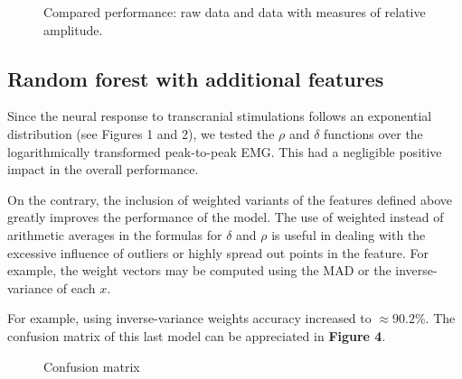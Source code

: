 \documentclass{article}
\begin{document}
\begin{multicols}{2}
\begin{figure}[H]
  \centering
  \hfill
  \caption{Compared performance: raw data and data with measures of relative
  amplitude.}
  \label{fig:two_images}
\end{figure}


\subsection{Random forest with additional features}

Since the neural response to transcranial stimulations follows an exponential
distribution (see Figures 1 and 2), we tested the $\rho$ and $\delta$ functions
over the logarithmically transformed peak-to-peak EMG. This had a negligible
positive impact in the overall performance.

On the contrary, the inclusion of weighted variants of the features defined
above greatly improves the performance of the model. The use of weighted instead
of arithmetic averages in the formulas for $\delta$ and $\rho$ is useful in
dealing with the excessive influence of outliers or highly spread out points in
the feature. For example, the weight vectors may be computed using the MAD or
the inverse-variance of each $x$. 

For example, using inverse-variance weights accuracy increased to $\approx
90.2\%$. The confusion matrix of this last model can be appreciated in
\textbf{Figure 4}.

\begin{figure}[H]
    \centering
    \caption{Confusion matrix}
    \label{fig:figure4}
\end{figure}


\end{multicols}
\end{document}
